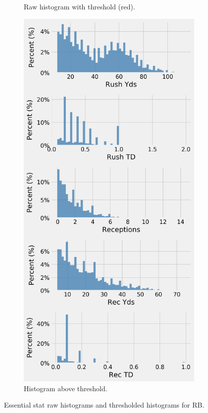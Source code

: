 \documentclass[12pt]{article}
\begin{document}
\begin{figure}[H]
\begin{subfigure}[b]{0.450\textwidth}
    \caption{Raw histogram with threshold (red).}
  \end{subfigure}
  \hfill
  \begin{subfigure}[b]{0.450\textwidth}
    \centering
    \includegraphics[width=1\textwidth]{../figures/threshold_hist_RB}
    \caption{Histogram above threshold.}
  \end{subfigure}
  \caption{Essential stat raw histograms and thresholded histograms for RB.}
\end{figure}
\end{document}
